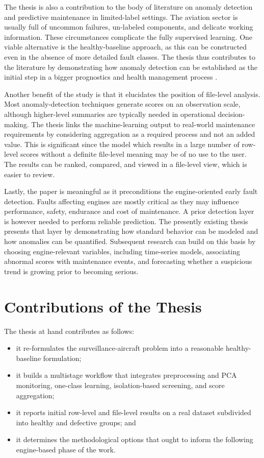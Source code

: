 \documentclass[12pt,a4paper]{report}
\begin{document}
	The thesis is also a contribution to the body of literature on anomaly detection and predictive maintenance in limited-label settings. The aviation sector is usually full of uncommon failures, un-labeled components, and delicate working information. These circumstances complicate the fully supervised learning. One viable alternative is the healthy-baseline approach, as this can be constructed even in the absence of more detailed fault classes. The thesis thus contributes to the literature by demonstrating how anomaly detection can be established as the initial step in a bigger prognostics and health management process \cite{basora2019aviation,basora2021fleet,scott2022defence}.
	
	Another benefit of the study is that it elucidates the position of file-level analysis. Most anomaly-detection techniques generate scores on an observation scale, although higher-level summaries are typically needed in operational decision-making. The thesis links the machine-learning output to real-world maintenance requirements by considering aggregation as a required process and not an added value. This is significant since the model which results in a large number of row-level scores without a definite file-level meaning may be of no use to the user. The results can be ranked, compared, and viewed in a file-level view, which is easier to review.
	
	Lastly, the paper is meaningful as it preconditions the engine-oriented early fault detection. Faults affecting engines are mostly critical as they may influence performance, safety, endurance and cost of maintenance. A prior detection layer is however needed to perform reliable prediction. The presently existing thesis presents that layer by demonstrating how standard behavior can be modeled and how anomalies can be quantified. Subsequent research can build on this basis by choosing engine-relevant variables, including time-series models, associating abnormal scores with maintenance events, and forecasting whether a suspicious trend is growing prior to becoming serious.
	
	\section{Contributions of the Thesis}
	
	The thesis at hand contributes as follows:
	
	\begin{itemize}
		\item it re-formulates the surveillance-aircraft problem into a reasonable healthy-baseline formulation;
		\item it builds a multistage workflow that integrates preprocessing and PCA monitoring, one-class learning, isolation-based screening, and score aggregation;
		\item it reports initial row-level and file-level results on a real dataset subdivided into healthy and defective groups; and
		\item it determines the methodological options that ought to inform the following engine-based phase of the work.
	\end{itemize}
	
\end{document}
